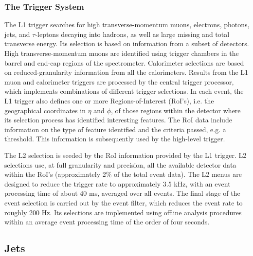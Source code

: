 \subsubsection{The Trigger System}

The L1 trigger searches for high transverse-momentum muons, electrons, photons, jets, and $\tau$-leptons decaying into hadrons, as well as large missing and total transverse energy. Its selection is based on information from a subset of detectors. High transverse-momentum muons are identified using trigger chambers in the barrel and end-cap regions of the spectrometer. Calorimeter selections are based on reduced-granularity information from all the calorimeters. Results from the L1 muon and calorimeter triggers are processed by the central trigger processor, which implements combinations of different trigger selections. In each event, the L1 trigger also defines one or more Regions-of-Interest (RoI’s), i.e. the geographical coordinates in $\eta$ and $\phi$, of those regions within the detector where its selection process has identified interesting features. The RoI data include information on the type of feature identified and the criteria passed, e.g. a threshold. This information is subsequently used by the high-level trigger.

The L2 selection is seeded by the RoI information provided by the L1 trigger. L2 selections use, at full granularity and precision, all the available detector data within the RoI’s (approximately 2\% of the total event data). The L2 menus are designed to reduce the trigger rate to approximately 3.5 kHz, with an event processing time of about 40 ms, averaged over all events. The final stage of the event selection is carried out by the event filter, which reduces the event rate to roughly 200 Hz. Its selections are implemented using offline analysis procedures within an average event processing time of the order of four seconds.




\subsection{Jets}\label{sec:jets}

